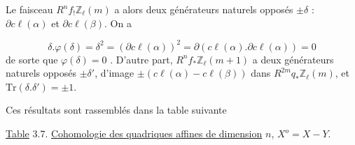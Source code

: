 \begin{center}
\end{center}
Le faisceau $R^n f_{!} \mathbb{Z}_\ell(m)$ a alors deux générateurs naturels opposés $\pm \delta$ : $\partial c\ell(\alpha)$ et $\partial c\ell(\beta)$. On a

\begin{equation*}
\delta . \varphi(\delta) = \delta^2 = (\partial c\ell(\alpha))^2 = \partial(c\ell(\alpha) . \partial c\ell(\alpha)) = 0
\end{equation*}
de sorte que $\varphi(\delta) = 0$ . D'autre part, $R^n f_{*} \mathbb{Z}_\ell(m+1)$ a deux générateurs naturels opposés $\pm \delta'$, d'image $\pm(c\ell(\alpha) - c\ell(\beta))$ dans $R^{2m} q_{*} \mathbb{Z}_\ell(m)$, et $\mathrm{Tr}(\delta . \delta') = \pm 1$.



Ces résultats sont rassemblés dans la table suivante

\underline{Table} 3.7.  \underline{Cohomologie des quadriques affines de dimension} $n$, $X^o = X - Y$.

